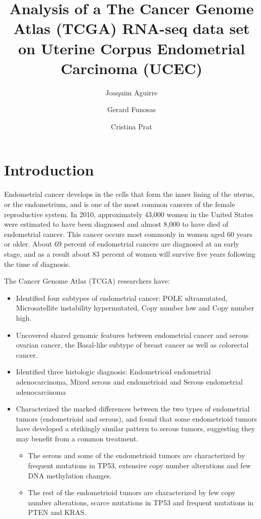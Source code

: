 \documentclass[9pt,twocolumn,twoside]{gsajnl}
\title{Analysis of a The Cancer Genome Atlas (TCGA) RNA-seq data set on Uterine Corpus Endometrial Carcinoma (UCEC)}
\author[$\ast$]{Joaquim Aguirre}
\author[$\ast$]{Gerard Funosas}
\author[$\ast$]{Cristina Prat}
\affil[$\ast$]{University Pompeu Fabra}
\begin{document}
\maketitle
\thispagestyle{firststyle}
\marginmark
\firstpagefootnote
{}
\vspace{-11pt}%


\section*{Introduction}

Endometrial cancer develops in the cells that form the inner lining of the uterus, or the endometrium, and is one of the most common cancers of the female reproductive system. In 2010, approximately 43,000 women in the United States were estimated to have been diagnosed and almost 8,000 to have died of endometrial cancer. This cancer occurs most commonly in women aged 60 years or older. About 69 percent of endometrial cancers are diagnosed at an early stage, and as a result about 83 percent of women will survive five years following the time of diagnosis.

The Cancer Genome Atlas (TCGA) \citep{TheCancerGenomeAtlas} researchers have: 
\begin{itemize}
\item Identified four subtypes of endometrial cancer: POLE ultramutated, Microsatellite instability hypermutated, Copy number low and Copy number high.
\item Uncovered shared genomic features between endometrial cancer and serous ovarian cancer, the Basal-like subtype of breast cancer as well as colorectal cancer.
\item Identified three histologic diagnosis: Endometrioid endometrial adenocarcinoma, Mixed serous and endometrioid and Serous endometrial adenocarcinoma
\item Characterized the marked differences between the two types of endometrial tumors (endometrioid and serous), and found that some endometrioid tumors have developed a strikingly similar pattern to serous tumors, suggesting they may benefit from a common treatment.
\begin{itemize}
\item The serous and some of the endometrioid tumors are characterized by frequent mutations in TP53, extensive copy number alterations and few DNA methylation changes.
\item The rest of the endometrioid tumors are characterized by few copy number alterations, scarce mutations in TP53 and frequent mutations in PTEN and KRAS.
\end{itemize}
\end{itemize}
\end{document}
